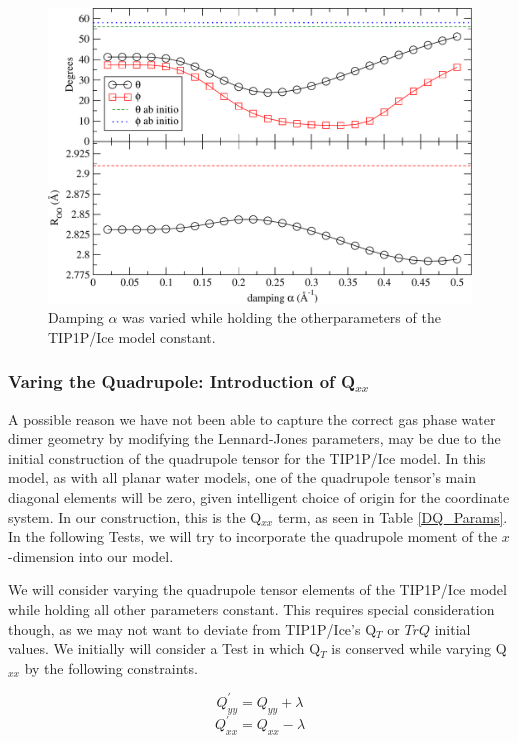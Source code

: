 \begin{figure}[h!]
\includegraphics[width = \linewidth]{Figures/Test3_plot.pdf}
\caption{\label{fig:Dalpha} Damping $\alpha$ was varied while holding the otherparameters of the TIP1P/Ice model constant.}
\end{figure}


\subsubsection{Varing the Quadrupole: Introduction of Q$_{xx}$}
A possible reason we have not been able to capture the correct gas phase water
dimer geometry by modifying the Lennard-Jones parameters, may be due to the
initial construction of the quadrupole tensor for the TIP1P/Ice model. In this
model,
as with all planar water models, one of the quadrupole tensor's main diagonal
elements will be zero, given intelligent choice of origin for the coordinate
system. In our construction, this is the Q$_{xx}$ term, as seen in Table
\ref{DQ_Params}. In the following Tests, we will try to incorporate 
the quadrupole moment of the $x$-dimension into our model.

We will consider varying the quadrupole tensor elements of the TIP1P/Ice
model while holding all other parameters constant. This requires special 
consideration though, as we may not want to deviate from TIP1P/Ice's Q$_T$
or $TrQ$ initial values. We initially will consider a Test in which Q$_T$ is 
conserved while varying Q$_{xx}$ by the following constraints. 

\begin{equation}
Q_{yy}^{'} = Q_{yy} + \lambda
\end{equation} 
\begin{equation}
Q_{xx}^{'} = Q_{xx} - \lambda
\end{equation}

